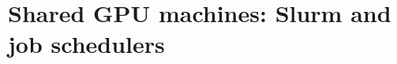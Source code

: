\chapter{Shared GPU machines: Slurm and job schedulers}
\label{ch:shared-gpu-machines-slurm-and-job}

